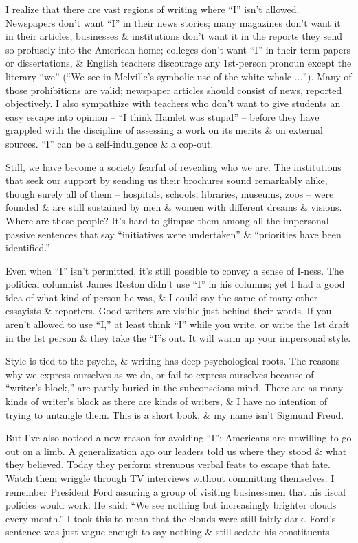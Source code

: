 \documentclass{article}
\begin{document}
I realize that there are vast regions of writing where ``I'' isn't allowed. Newspapers don't want ``I'' in their news stories; many magazines don't want it in their articles; businesses \& institutions don't want it in the reports they send so profusely into the American home; colleges don't want ``I'' in their term papers or dissertations, \& English teachers discourage any 1st-person pronoun except the literary ``we'' (``We see in Melville's symbolic use of the white whale $\ldots$''). Many of those prohibitions are valid; newspaper articles should consist of news, reported objectively. I also sympathize with teachers who don't want to give students an easy escape into opinion -- ``I think Hamlet was stupid'' -- before they have grappled with the discipline of assessing a work on its merits \& on external sources. ``I'' can be a self-indulgence \& a cop-out.

Still, we have become a society fearful of revealing who we are. The institutions that seek our support by sending us their brochures sound remarkably alike, though surely all of them -- hospitals, schools, libraries, museums, zoos -- were founded \& are still sustained by men \& women with different dreams \& visions. Where are these people? It's hard to glimpse them among all the impersonal passive sentences that say ``initiatives were undertaken'' \& ``priorities have been identified.''

Even when ``I'' isn't permitted, it's still possible to convey a sense of I-ness. The political columnist James Reston didn't use ``I'' in his columns; yet I had a good idea of what kind of person he was, \& I could say the same of many other essayists \& reporters. Good writers are visible just behind their words. If you aren't allowed to use ``I,'' at least think ``I'' while you write, or write the 1st draft in the 1st person \& they take the ``I''s out. It will warm up your impersonal style.

Style is tied to the psyche, \& writing has deep psychological roots. The reasons why we express ourselves as we do, or fail to express ourselves because of ``writer's block,'' are partly buried in the subconscious mind. There are as many kinds of writer's block as there are kinds of writers, \& I have no intention of trying to untangle them. This is a short book, \& my name isn't Sigmund Freud.

But I've also noticed a new reason for avoiding ``I'': Americans are unwilling to go out on a limb. A generalization ago our leaders told us where they stood \& what they believed. Today they perform strenuous verbal feats to escape that fate. Watch them wriggle through TV interviews without committing themselves. I remember President Ford assuring a group of visiting businessmen that his fiscal policies would work. He said: ``We see nothing but increasingly brighter clouds every month.'' I took this to mean that the clouds were still fairly dark. Ford's sentence was just vague enough to say nothing \& still sedate his constituents.
\end{document}
